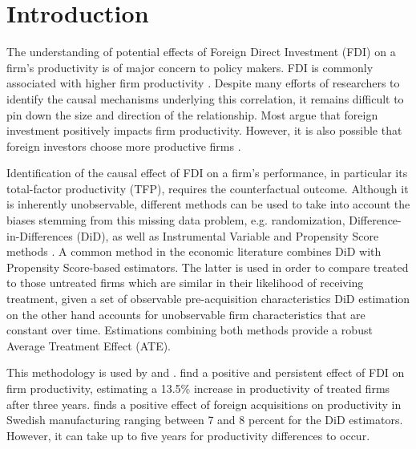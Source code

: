 \documentclass[a4paper,11pt]{scrartcl}
\begin{document}
\section{Introduction}

The understanding of potential effects of Foreign Direct Investment (FDI) on a firm's productivity is of major concern to policy makers. FDI is commonly associated with higher firm productivity \citep{girma2007}. Despite many efforts of researchers to identify the causal mechanisms underlying this correlation, it remains difficult to pin down the size and direction of the relationship. Most argue that foreign investment positively impacts firm productivity. However, it is also possible that foreign investors choose %
more productive firms \citep{arnold2009}. %

Identification of%
the causal effect of FDI on a firm’s performance, %
in particular %
its total-factor productivity (TFP), %
requires the counterfactual outcome. Although it is inherently unobservable, different methods can be used to take into account the biases stemming from this missing data problem, e.g. randomization, Difference-in-Differences (DiD), as well as %
Instrumental Variable and Propensity Score methods \citep{karpaty2007}. A common method in the economic literature combines DiD with Propensity Score-based estimators. The latter %
is used in order to compare treated to those untreated firms which are similar in their likelihood of receiving treatment, given a set of observable pre-acquisition characteristics %
DiD estimation on the other hand accounts for unobservable firm characteristics that are constant over time. Estimations combining both methods provide a robust Average Treatment Effect (ATE). 

This methodology is used by \citet{arnold2009, karpaty2007, girma2007} and \citet{schiffbauer2017}. \citet{arnold2009}  find a positive and persistent effect of FDI on firm productivity, estimating a 13.5\% increase in productivity of treated firms after three years.\citet{karpaty2007} finds a positive effect of foreign acquisitions on productivity in Swedish manufacturing ranging between 7 and 8 percent for the DiD estimators. However, it can take up to five years for productivity differences to occur. 
\end{document}
